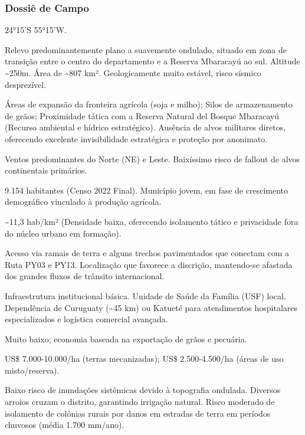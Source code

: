 \subsubsection{Dossiê de Campo}
\begin{description}[style=nextline,leftmargin=0.5cm,font=\bfseries]
\item[Coordenadas]  24°15'S 55°15'W.
\item[Topographical]  Relevo predominantemente plano a suavemente ondulado, situado em zona de transição entre o centro do departamento e a Reserva Mbaracayú ao sul. Altitude \textasciitilde 250m. Área de \textasciitilde 807 km². Geologicamente muito estável, risco sísmico desprezível.
\item[Alvos Estratégicos]  Áreas de expansão da fronteira agrícola (soja e milho); Silos de armazenamento de grãos; Proximidade tática com a Reserva Natural del Bosque Mbaracayú (Recurso ambiental e hídrico estratégico). Ausência de alvos militares diretos, oferecendo excelente invisibilidade estratégica e proteção por anonimato.
\item[Fallout]  Ventos predominantes do Norte (NE) e Leste. Baixíssimo risco de fallout de alvos continentais primários.
\item[População]  9.154 habitantes (Censo 2022 Final). Município jovem, em fase de crescimento demográfico vinculado à produção agrícola.
\item[Densidade]  \textasciitilde 11,3 hab/\allowbreak km² (Densidade baixa, oferecendo isolamento tático e privacidade fora do núcleo urbano em formação).
\item[Vias de Acesso]  Acesso via ramais de terra e alguns trechos pavimentados que conectam com a Ruta PY03 e PY13. Localização que favorece a discrição, mantendo-se afastada dos grandes fluxos de trânsito internacional.
\item[Serviços]  Infraestrutura institucional básica. Unidade de Saúde da Família (USF) local. Dependência de Curuguaty (\textasciitilde 45 km) ou Katueté para atendimentos hospitalares especializados e logística comercial avançada.
\item[Custo de Vida]  Muito baixo; economia baseada na exportação de grãos e pecuária.
\item[Preço da Terra]  US\$ 7.000-10.000/\allowbreak ha (terras mecanizadas); US\$ 2.500-4.500/\allowbreak ha (áreas de uso misto/\allowbreak reserva).
\item[Hidrologia]  Baixo risco de inundações sistêmicas devido à topografia ondulada. Diversos arroios cruzam o distrito, garantindo irrigação natural. Risco moderado de isolamento de colônias rurais por danos em estradas de terra em períodos chuvosos (média 1.700 mm/\allowbreak ano).

\end{description}
